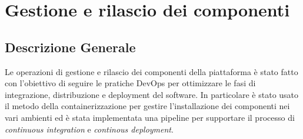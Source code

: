 \chapter{Gestione e rilascio dei componenti}
\section{Descrizione Generale}
Le operazioni di gestione e rilascio dei componenti della piattaforma è stato fatto con l'obiettivo
di seguire le pratiche DevOps per ottimizzare le fasi di integrazione, distribuzione e deployment
del software. In particolare è stato usato il metodo della containerizzazione per gestire l'installazione dei componenti
nei vari ambienti ed è stata implementata una pipeline per supportare il processo di \textit{continuous integration}
e \textit{continous deployment}.



